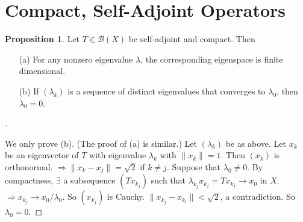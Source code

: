 \documentclass{article}
\theoremstyle{definition}
\newtheorem{prop}{Proposition}
\newenvironment{proofs}[1][\proofname]{%
  \begin{proof}[#1]$ $\par\nobreak\ignorespaces
}{%
  \end{proof}
}
\newcommand{\B}{\mathcal B}
\begin{document}
\section{Compact, Self-Adjoint Operators}

\begin{prop}
	Let $T \in \B(X)$ be self-adjoint and compact.
	Then 
	\begin{enumerate}
		\item[(a)] For any nonzero eigenvalue $\lambda$, the corresponding eigenspace is finite dimensional.

		\item[(b)] If $(\lambda_k)$ is a sequence of distinct eigenvalues that converges to $\lambda_0$, then $\lambda_0 = 0$.
	\end{enumerate}
\end{prop}

\begin{proofs}
	We only prove (b).
	(The proof of (a) is similar.)
	Let $(\lambda_k)$ be as above.
	Let $x_k$ be an eigenvector of $T$ with eigenvalue $\lambda_k$ with $\|x_k\| = 1$.
	Then $(x_k)$ is orthonormal.
	$\Rightarrow \|x_k - x_j\| = \sqrt{2}$ if $k \neq j$.
	Suppose that $\lambda_0 \neq 0$.
	By compactness, $\exists$ a subsequence $(T x_{k_j})$ such that $\lambda_{k_j} x_{k_j} = T x_{k_j} \to x_0$ in $X$.
	$\Rightarrow x_{k_j} \to x_0/\lambda_0$.
	So $(x_{k_j})$ is Cauchy.
	$\|x_{k_j} - x_{k_l}\| < \sqrt{2}$, a contradiction.
	So $\lambda_0 = 0$.
\end{proofs}
\end{document}
